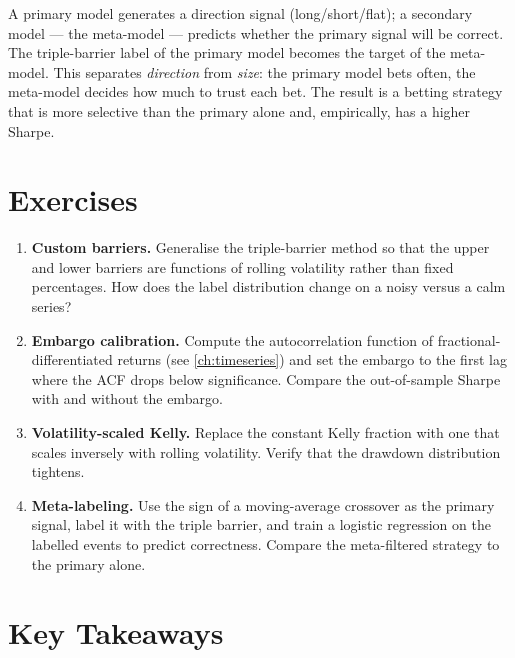 A primary model generates a direction signal (long/short/flat); a
secondary model --- the meta-model --- predicts whether the primary
signal will be correct. The triple-barrier label of the primary
model becomes the target of the meta-model. This separates
\emph{direction} from \emph{size}: the primary model bets often, the
meta-model decides how much to trust each bet. The result is a
betting strategy that is more selective than the primary alone and,
empirically, has a higher Sharpe.

\section{Exercises}

\begin{enumerate}
    \item \textbf{Custom barriers.} Generalise the triple-barrier
      method so that the upper and lower barriers are functions of
      rolling volatility rather than fixed percentages. How does the
      label distribution change on a noisy versus a calm series?
    \item \textbf{Embargo calibration.} Compute the autocorrelation
      function of fractional-differentiated returns (see
      \cref{ch:timeseries}) and set the embargo to the first lag
      where the ACF drops below significance. Compare the
      out-of-sample Sharpe with and without the embargo.
    \item \textbf{Volatility-scaled Kelly.} Replace the constant
      Kelly fraction with one that scales inversely with rolling
      volatility. Verify that the drawdown distribution tightens.
    \item \textbf{Meta-labeling.} Use the sign of a moving-average
      crossover as the primary signal, label it with the triple
      barrier, and train a logistic regression on the labelled events
      to predict correctness. Compare the meta-filtered strategy to
      the primary alone.
\end{enumerate}

\section{Key Takeaways}

